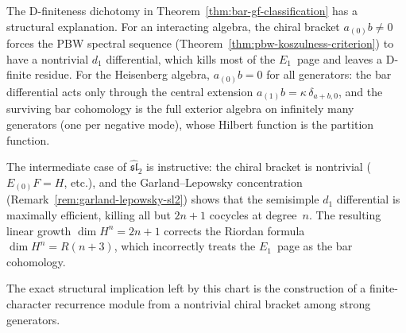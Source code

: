 \begin{remark}
\label{rem:d-finiteness-dichotomy}
The D-finiteness dichotomy in
Theorem~\ref{thm:bar-gf-classification} has a structural
explanation.
For an interacting algebra, the chiral bracket
$a_{(0)}b \neq 0$ forces the PBW spectral sequence
(Theorem~\ref{thm:pbw-koszulness-criterion}) to have a
nontrivial $d_1$ differential, which kills most of the
$E_1$~page and leaves a D-finite residue.
For the Heisenberg algebra, $a_{(0)}b = 0$ for all generators:
the bar differential acts only through the central extension
$a_{(1)}b = \kappa\,\delta_{a+b,0}$, and the surviving bar
cohomology is the full exterior algebra on infinitely many
generators (one per negative mode), whose Hilbert function
is the partition function.

The intermediate case of $\widehat{\mathfrak{sl}}_2$ is
instructive: the chiral bracket is nontrivial
($E_{(0)}F = H$, etc.), and the Garland--Lepowsky
concentration (Remark~\ref{rem:garland-lepowsky-sl2}) shows
that the semisimple $d_1$ differential is maximally
efficient, killing all but $2n{+}1$ cocycles at degree~$n$.
The resulting linear growth $\dim H^n = 2n+1$ corrects the
Riordan formula $\dim H^n = R(n{+}3)$, which incorrectly
treats the $E_1$~page as the bar cohomology.

The exact structural implication left by this chart is the construction
of a finite-character recurrence module from a nontrivial chiral bracket
among strong generators.
\end{remark}


